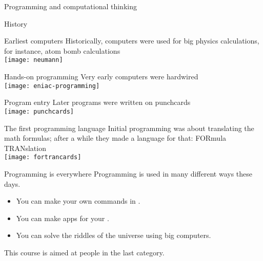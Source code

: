 
 {Programming and computational thinking}

 {History}

\begin{block}{Earliest computers}
  \label{sl:neumann}
  Historically, computers were used for big physics calculations, for
  instance, atom bomb calculations\\
  \texttt{[image: neumann]}
\end{block}

\begin{block}{Hands-on programming}
  \label{sl:eniac}
  Very early computers were hardwired\\
  \texttt{[image: eniac-programming]}
\end{block}

\begin{block}{Program entry}
  \label{sl:punch}
  Later programs were written on punchcards\\
  \texttt{[image: punchcards]}
\end{block}

\begin{block}{The first programming language}
  \label{sl:fcard}
  Initial programming was about translating the math formulas; after a
  while they made a language for that: FORmula TRANslation\\
  \texttt{[image: fortrancards]}
\end{block}

\begin{block}{Programming is everywhere}
  \label{sl:progeverywhere}
  Programming is used in many different ways these days.
  \begin{itemize}
  \item You can make your own commands in
    .
  \item You can make apps for your .
  \item You can solve the riddles of the universe using big computers.
  \end{itemize}
  This course is aimed at people in the last category.
\end{block}

